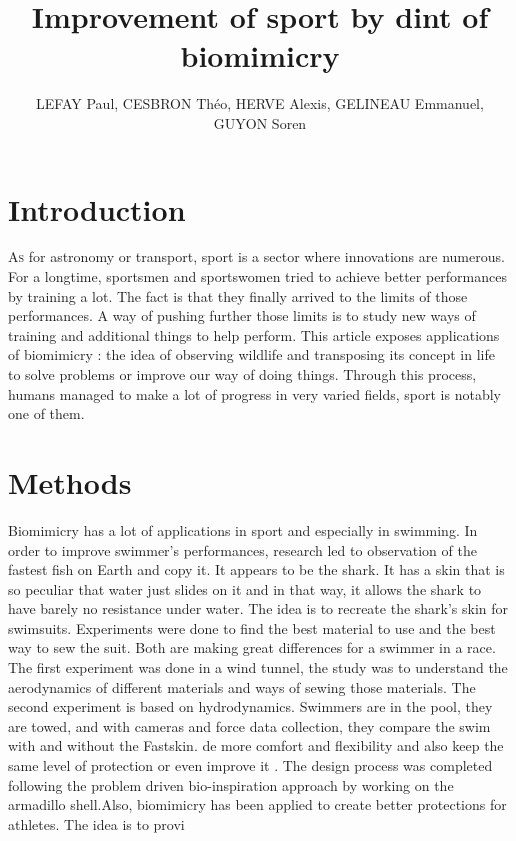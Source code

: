 \documentclass[twoside,twocolumn]{article}                          %
\title{Improvement of sport by dint of biomimicry}               %
\author{LEFAY Paul, CESBRON Théo, HERVE Alexis, GELINEAU Emmanuel, GUYON Soren}                                              %
\begin{document}
\renewcommand\thesection{\Roman{section}}                           %
\renewcommand\thesubsection{\roman{subsection}}                     %


\cfoot{\thepage}

\maketitle{}										                                    %

\newpage


\section{Introduction}
\lettrine[nindent=0em,lines=2]{A} s for astronomy or transport, sport is a sector where innovations are numerous. For a longtime, sportsmen and sportswomen tried to achieve better performances by training a lot. The fact is that they finally arrived to the limits of those performances. A way of pushing further those limits is to study new ways of training and additional things to help perform. This article exposes applications of biomimicry : the idea of observing wildlife and transposing its concept in life to solve problems or improve our way of doing things. Through this process, humans managed to make a lot of progress in very varied fields, sport is notably one of them.


\section{Methods}
Biomimicry has a lot of applications in sport and especially in swimming.
In order to improve swimmer’s performances, research led to observation of the fastest fish on Earth and copy it. It appears to be the shark. It has a skin that is so peculiar that water just slides on it and in that way, it allows the shark to have barely no resistance under water. The idea is to recreate the shark’s skin for swimsuits. Experiments were done to find the best material to use and the best way to sew the suit. Both are making great differences for a swimmer in a race. The first experiment was done in a wind tunnel, the study was to understand the aerodynamics of different materials and ways of sewing those materials. The second experiment is based on hydrodynamics. Swimmers are in the pool, they are towed, and with cameras and force data collection, they compare the swim with and without the Fastskin.
de more comfort and flexibility and also keep the same level of protection or even improve it . The design process was completed following the problem driven bio-inspiration approach by working on the armadillo shell\cite{armadillo}.Also, biomimicry has been applied to create better protections for athletes. The idea is to provi
\end{document}

